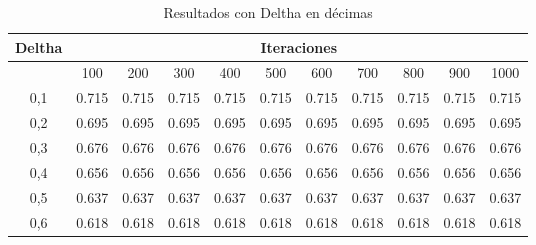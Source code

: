 \begin{table}[H]
\small
\caption{Resultados con Deltha en décimas}
\begin{tabular}{|c|r|r|r|r|r|r|r|r|r|r|}
\hline
\multicolumn{1}{|l|}{Deltha} & \multicolumn{10}{c|}{Iteraciones} \\ \hline
\multicolumn{1}{|l|}{}       & \multicolumn{1}{c|}{100} & \multicolumn{1}{c|}{200} & \multicolumn{1}{c|}{300} & \multicolumn{1}{c|}{400} & \multicolumn{1}{c|}{500} & \multicolumn{1}{c|}{600} & \multicolumn{1}{c|}{700} & \multicolumn{1}{c|}{800} & \multicolumn{1}{c|}{900} & \multicolumn{1}{c|}{1000} \\ \hline
0,1                          & 0.715                    & 0.715                    & 0.715                    & 0.715                    & 0.715                    & 0.715                    & 0.715                    & 0.715                    & 0.715                    & 0.715                     \\ \hline
0,2                          & 0.695                    & 0.695                    & 0.695                    & 0.695                    & 0.695                    & 0.695                    & 0.695                    & 0.695                    & 0.695                    & 0.695                     \\ \hline
0,3                          & 0.676                    & 0.676                    & 0.676                    & 0.676                    & 0.676                    & 0.676                    & 0.676                    & 0.676                    & 0.676                    & 0.676                     \\ \hline
0,4                          & 0.656                    & 0.656                    & 0.656                    & 0.656                    & 0.656                    & 0.656                    & 0.656                    & 0.656                    & 0.656                    & 0.656                     \\ \hline
0,5                          & 0.637                    & 0.637                    & 0.637                    & 0.637                    & 0.637                    & 0.637                    & 0.637                    & 0.637                    & 0.637                    & 0.637                     \\ \hline
0,6                          & 0.618                    & 0.618                    & 0.618                    & 0.618                    & 0.618                    & 0.618                    & 0.618                    & 0.618                    & 0.618                    & 0.618                     \\ \hline

\end{tabular}
\end{table}
